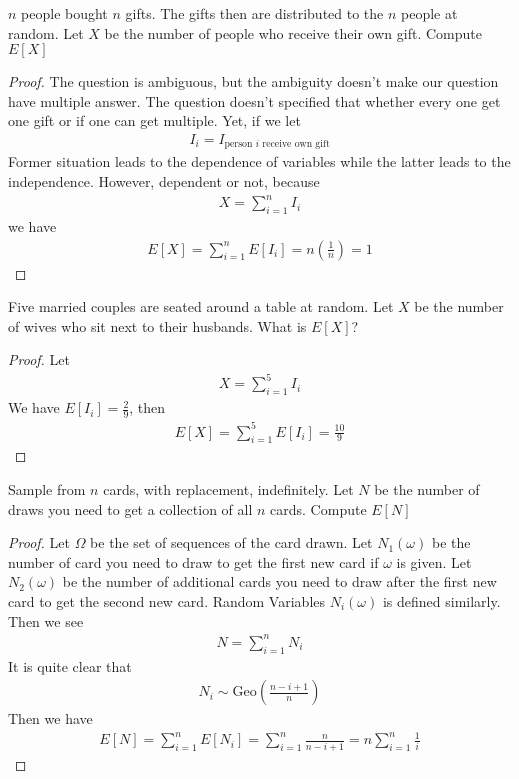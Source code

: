 \documentclass{report}
\begin{document}
\begin{question}{}{}
$n$ people bought $n$ gifts. The gifts then are distributed to the $n$ people at random. Let $X$ be the number of people who receive their own gift. Compute  $E[X]$
\end{question}
\begin{proof}
The question is ambiguous, but the ambiguity doesn't make our question have multiple answer. The question doesn't specified that whether every one get one gift or if one can get multiple. Yet, if we let 
\begin{align*}
I_i=I_{\text{person $i$ receive own gift}}
\end{align*}
Former situation leads to the dependence of variables while the latter leads to the independence. However, dependent or not, because 
\begin{align*}
X=\sum_{i=1}^{n}I_i
\end{align*}
we have 
\begin{align*}
E[X]=\sum_{i=1}^{n}E[I_i]=n (\frac{1}{n})=1
\end{align*}
\end{proof}
\begin{question}{}{}
Five married couples are seated around a table at random. Let $X$ be the number of wives who sit next to their husbands. What is  $E[X]$? 
\end{question}
\begin{proof}
Let 
\begin{align*}
X=\sum_{i=1}^5 I_i
\end{align*}
We have $E[I_i]=\frac{2}{9}$, then 
\begin{align*}
  E[X]=\sum_{i=1}^5 E[I_i]=\frac{10}{9}
\end{align*}
\end{proof}
\begin{question}{}{}
Sample from $n$ cards, with replacement, indefinitely. Let $N$ be the number of draws you need to get a collection of all $n$ cards. Compute $E[N]$
\end{question}
\begin{proof}
Let $\Omega$ be the set of sequences of the card drawn. Let $N_1(\omega)$ be the number of card you need to draw to get the first new card if $\omega$ is given. Let $N_2(\omega)$ be the number of additional cards you need to draw after the first new card to get the second new card. Random Variables $N_{i}(\omega)$ is defined similarly. Then we see 
\begin{align*}
N=\sum_{i=1}^n N_i
\end{align*}
It is quite clear that 
\begin{align*}
N_i \sim \text{Geo}(\frac{n-i+1}{n})
\end{align*}
Then we have 
\begin{align*}
E[N]=\sum_{i=1}^n E[N_i]=\sum_{i=1}^n \frac{n}{n-i+1}=n\sum_{i=1}^n \frac{1}{i} 
\end{align*}
\end{proof}
\end{document}
